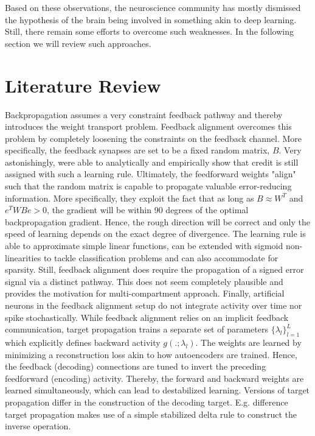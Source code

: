 \documentclass[colorinlistoftodos]{article}
\theoremstyle{definition}
\begin{document}
Based on these observations, the neuroscience community has mostly dismissed the hypothesis of the brain being involved in something akin to deep learning. Still, there remain some efforts to overcome such weaknesses. In the following section we will review such approaches.

\newpage
\section{Literature Review}

Backpropagation assumes a very constraint feedback pathway and thereby introduces the weight transport problem. Feedback alignment \citep{lillicrap2016} overcomes this problem by completely loosening the constraints on the feedback channel. More specifically, the feedback synapses are set to be a fixed random matrix, $B$. Very astonishingly, \citet{lillicrap2016} were able to analytically and empirically show that credit is still assigned with such a learning rule.
Ultimately, the feedforward weights "align" such that the random matrix is capable to propagate valuable error-reducing information. More specifically, they exploit the fact that as long as $B \approx W^T$ and $e^TWBe > 0$, the gradient will be within 90 degrees of the optimal backpropagation gradient. Hence, the rough direction will be correct and only the speed of learning depends on the exact degree of divergence.
The learning rule is able to approximate simple linear functions, can be extended with sigmoid non-linearities to tackle classification problems and can also accommodate for sparsity. Still, feedback alignment does require the propagation of a signed error signal via a distinct pathway. This does not seem completely plausible and provides the motivation for \citet{guerguiev2017} multi-compartment approach. Finally, artificial neurons in the feedback alignment setup do not integrate activity over time nor spike stochastically.
While feedback alignment relies on an implicit feedback communication, target propagation \citep{lecun_1986} trains a separate set of parameters $\{\lambda_l\}_{l=1}^L$ which explicitly defines backward activity $g(.; \lambda_l)$.
The weights are learned by minimizing a reconstruction loss akin to how autoencoders are trained. Hence, the feedback (decoding) connections are tuned to invert the preceding feedforward (encoding) activity. Thereby, the forward and backward weights are learned simultaneously, which can lead to destabilized learning.
Versions of target propagation differ in the construction of the decoding target. E.g. difference target propagation \citep{lee2015} makes use of a simple stabilized delta rule to construct the inverse operation.  
\end{document}
